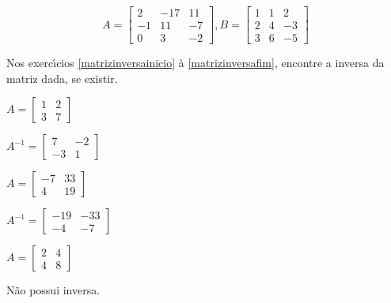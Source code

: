 \documentclass[12pt]{exam}
\begin{document}
\begin{exercicio}\label{matrizfim}
  \[
    A =\begin{bmatrix}
      2 & -17 & 11\\
      -1 & 11 & -7\\
      0 & 3 & -2
    \end{bmatrix}, B =\begin{bmatrix}
      1 & 1 & 2\\
      2 & 4 & -3\\
      3 & 6 & -5
    \end{bmatrix}
  \]
\end{exercicio}

Nos exerc{\'\i}cios \ref{matrizinversainicio} \`a \ref{matrizinversafim}, encontre a inversa da matriz dada, se existir.

\begin{exercicio}\label{matrizinversainicio}
  $
    A =\begin{bmatrix}
        1 & 2\\
        3 & 7
    \end{bmatrix}
  $
  \begin{solucao}
    $A^{-1} =\begin{bmatrix}
      7 & -2\\
      -3 & 1
    \end{bmatrix}$
  \end{solucao}
\end{exercicio}

\begin{exercicio}
  $
    A =\begin{bmatrix}
        -7 & 33\\
        4 & 19
    \end{bmatrix}
  $
  \begin{solucao}
    $A^{-1} =\begin{bmatrix}
      -19 & -33\\
      -4 & -7
    \end{bmatrix}$
  \end{solucao}
\end{exercicio}

\begin{exercicio}
  $
    A =\begin{bmatrix}
        2 & 4\\
        4 & 8
    \end{bmatrix}
  $
  \begin{solucao}
    N\~ao possui inversa.
  \end{solucao}
\end{exercicio}
\end{document}
